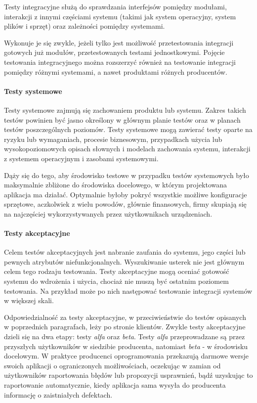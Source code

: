 Testy integracyjne służą do sprawdzania interfejsów pomiędzy modułami, interakcji z innymi częściami systemu (takimi jak system operacyjny, system plików i sprzęt) oraz zależności pomiędzy systemami.

Wykonuje je się zwykle, jeżeli tylko jest możliwość przetestowania integracji gotowych już modułów, przetestowanych testami jednostkowymi. Pojęcie testowania integracyjnego można rozszerzyć również na testowanie integracji pomiędzy różnymi systemami, a nawet produktami różnych producentów.\cite{bib:sylabus:foundation}

\paragraph{Testy systemowe}

Testy systemowe zajmują się zachowaniem produktu lub systemu. Zakres takich testów powinien być jasno określony w głównym planie testów oraz w planach testów poszczególnych poziomów. Testy systemowe mogą zawierać testy oparte na ryzyku lub wymaganiach, procesie biznesowym, przypadkach użycia lub wysokopoziomowych opisach słownych i modelach zachowania systemu, interakcji z systemem operacyjnym i zasobami systemowymi.

Dąży się do tego, aby środowisko testowe w przypadku testów systemowych było maksymalnie zbliżone do środowiska docelowego, w którym projektowana aplikacja ma działać. Optymalnie byłoby pokryć wszystkie możliwe konfiguracje sprzętowe, aczkolwiek z wielu powodów, głównie finansowych, firmy skupiają się na najczęściej wykorzystywanych przez użytkownikach urządzeniach.\cite{bib:sylabus:foundation} 

\paragraph{Testy akceptacyjne}

Celem testów akceptacyjnych jest nabranie zaufania do systemu, jego części lub pewnych atrybutów niefunkcjonalnych. Wyszukiwanie usterek nie jest głównym celem tego rodzaju testowania. Testy akceptacyjne mogą oceniać gotowość systemu do wdrożenia i użycia, chociaż nie muszą być ostatnim poziomem testowania. Na przykład może po nich następować testowanie integracji systemów w większej skali.

Odpowiedzialność za testy akceptacyjne, w przeciwieństwie do testów opisanych w poprzednich paragrafach, leży po stronie klientów. Zwykle testy akceptacyjne dzieli się na dwa etapy: testy \textit{alfa} oraz \textit{beta}. Testy \textit{alfa} przeprowadzane są przez przyszłych użytkowników w siedzibie producenta, natomiast \textit{beta} - w środowisku docelowym. W praktyce producenci oprogramowania przekazują darmowe wersje swoich aplikacji o ograniczonych możliwościach, oczekując w zamian od użytkowników raportowania błędów lub propozycji usprawnień, bądź uzyskując to raportowanie automatycznie, kiedy aplikacja sama wysyła do producenta informację o zaistniałych defektach.\cite{bib:sylabus:foundation}

